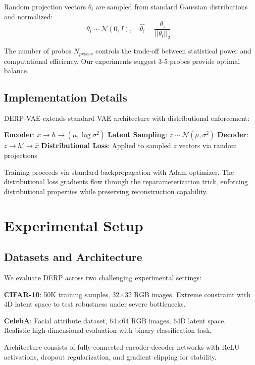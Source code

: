 \documentclass[11pt]{article}
\begin{document}
Random projection vectors $\theta_i$ are sampled from standard Gaussian distributions and normalized:
\begin{equation}
\theta_i \sim \mathcal{N}(0, I), \quad \hat{\theta_i} = \frac{\theta_i}{||\theta_i||_2}
\end{equation}

The number of probes $N_{probes}$ controls the trade-off between statistical power and computational efficiency. Our experiments suggest 3-5 probes provide optimal balance.

\subsection{Implementation Details}

DERP-VAE extends standard VAE architecture with distributional enforcement:

\textbf{Encoder}: $x \rightarrow h \rightarrow (\mu, \log\sigma^2)$ 
\textbf{Latent Sampling}: $z \sim \mathcal{N}(\mu, \sigma^2)$
\textbf{Decoder}: $z \rightarrow h' \rightarrow \hat{x}$
\textbf{Distributional Loss}: Applied to sampled $z$ vectors via random projections

Training proceeds via standard backpropagation with Adam optimizer. The distributional loss gradients flow through the reparameterization trick, enforcing distributional properties while preserving reconstruction capability.

\section{Experimental Setup}

\subsection{Datasets and Architecture}

We evaluate DERP across two challenging experimental settings:

\textbf{CIFAR-10}: 50K training samples, 32×32 RGB images. Extreme constraint with 4D latent space to test robustness under severe bottlenecks.

\textbf{CelebA}: Facial attribute dataset, 64×64 RGB images, 64D latent space. Realistic high-dimensional evaluation with binary classification task.

Architecture consists of fully-connected encoder-decoder networks with ReLU activations, dropout regularization, and gradient clipping for stability.
\end{document}
